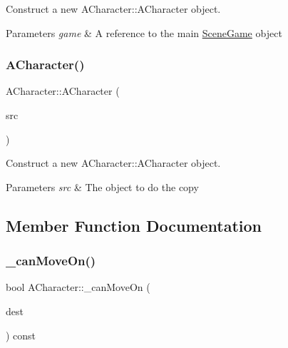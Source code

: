 Construct a new A\+Character\+::\+A\+Character object. 


\begin{DoxyParams}{Parameters}
{\em game} & A reference to the main \hyperlink{class_scene_game}{Scene\+Game} object \\
\hline
\end{DoxyParams}
\mbox{\label{class_a_character_a157dffb2b05045b84dd3302267696bcd}} 
\subsubsection{\texorpdfstring{A\+Character()}{ACharacter()}\hspace{0.1cm}{\footnotesize\ttfamily [2/2]}}
{\footnotesize\ttfamily A\+Character\+::\+A\+Character (\begin{DoxyParamCaption}\item[{\hyperlink{class_a_character}{A\+Character} const \&}]{src }\end{DoxyParamCaption})}



Construct a new A\+Character\+::\+A\+Character object. 


\begin{DoxyParams}{Parameters}
{\em src} & The object to do the copy \\
\hline
\end{DoxyParams}


\subsection{Member Function Documentation}
\mbox{\label{class_a_character_afbdeafa3e136320d980db3cf7f1fe7c7}} 
\subsubsection{\texorpdfstring{\+\_\+can\+Move\+On()}{\_canMoveOn()}}
{\footnotesize\ttfamily bool A\+Character\+::\+\_\+can\+Move\+On (\begin{DoxyParamCaption}\item[{glm\+::vec3}]{dest }\end{DoxyParamCaption}) const\hspace{0.3cm}{\ttfamily [protected]}}



